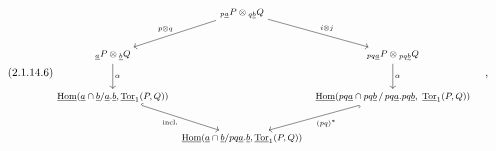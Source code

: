 \begin{equation}\tag{2.1.14.6}
{\footnotesize \begin{tikzcd}[row sep=large, column sep=tiny]
& {}_{p\underline{a}}P \otimes {}_{q\underline{b}}Q \arrow[dl, "p{\otimes}q"'] \arrow[dr, "i{\otimes}j"] & \\
{}_{\underline{a}}P \otimes {}_{\underline{b}}Q \arrow[d, "\alpha"] & & {}_{pq\underline{a}}P \otimes {}_{pq\underline{b}}Q \arrow[d, "\alpha"] \\
\underline{\mathrm{Hom}}(\underline{a}\cap\underline{b}/\underline{a}.\underline{b},\underline{\mathrm{Tor}}_1(P,Q)) \arrow[dr, hook, "\mathrm{incl.}"'] & & \underline{\mathrm{Hom}}(pq\underline{a}\cap pq\underline{b} \,/\, pq\underline{a}.pq\underline{b},\ \underline{\mathrm{Tor}}_1(P,Q)) \arrow[dl, hook, "(pq)^{*}"] \\
& \underline{\mathrm{Hom}}(\underline{a}\cap\underline{b}/pq\underline{a}.\underline{b},\underline{\mathrm{Tor}}_1(P,Q)) &
\end{tikzcd}}\quad ,
\end{equation}
